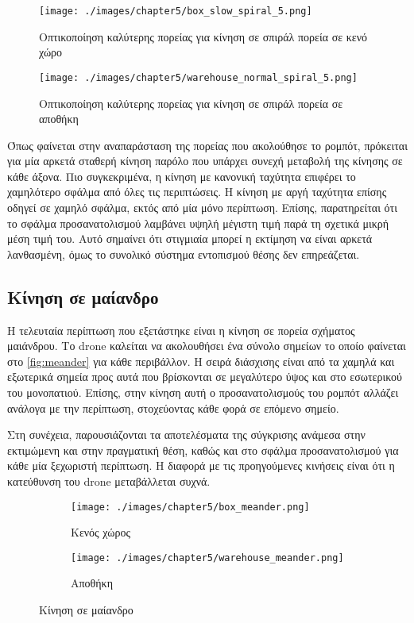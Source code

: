 \begin{figure}[!ht]
    \centering
    \texttt{[image: ./images/chapter5/box\_slow\_spiral\_5.png]}
    \caption{Οπτικοποίηση καλύτερης πορείας για κίνηση σε σπιράλ πορεία σε κενό χώρο}
    \label{fig:path_spiral_slow_corridor}
\end{figure}

\begin{figure}[!ht]
    \centering
    \texttt{[image: ./images/chapter5/warehouse\_normal\_spiral\_5.png]}
    \caption{Οπτικοποίηση καλύτερης πορείας για κίνηση σε σπιράλ πορεία σε αποθήκη}
    \label{fig:path_spiral_normal_warehouse}
\end{figure}
Όπως φαίνεται στην αναπαράσταση της πορείας που ακολούθησε το ρομπότ, πρόκειται για μία αρκετά σταθερή κίνηση παρόλο που υπάρχει συνεχή μεταβολή της κίνησης σε κάθε άξονα. Πιο συγκεκριμένα, η κίνηση με κανονική ταχύτητα επιφέρει το χαμηλότερο σφάλμα από όλες τις περιπτώσεις. Η κίνηση με αργή ταχύτητα επίσης οδηγεί σε χαμηλό σφάλμα, εκτός από μία μόνο περίπτωση. Επίσης, παρατηρείται ότι το σφάλμα προσανατολισμού λαμβάνει υψηλή μέγιστη τιμή παρά τη σχετικά μικρή μέση τιμή του. Αυτό σημαίνει ότι στιγμιαία μπορεί η εκτίμηση να είναι αρκετά λανθασμένη, όμως το συνολικό σύστημα εντοπισμού θέσης δεν επηρεάζεται.

\clearpage

\subsection{Κίνηση σε μαίανδρο}
\label{subsection:localization_tests_meander}

Η τελευταία περίπτωση που εξετάστηκε είναι η κίνηση σε πορεία σχήματος μαιάνδρου. Το drone καλείται να ακολουθήσει ένα σύνολο σημείων το οποίο φαίνεται στο \autoref{fig:meander} για κάθε περιβάλλον. Η σειρά διάσχισης είναι από τα χαμηλά και εξωτερικά σημεία προς αυτά που βρίσκονται σε μεγαλύτερο ύψος και στο εσωτερικού του μονοπατιού. Επίσης, στην κίνηση αυτή ο προσανατολισμούς του ρομπότ αλλάζει ανάλογα με την περίπτωση, στοχεύοντας κάθε φορά σε επόμενο σημείο.

Στη συνέχεια, παρουσιάζονται τα αποτελέσματα της σύγκρισης ανάμεσα στην εκτιμώμενη και στην πραγματική θέση, καθώς και στο σφάλμα προσανατολισμού για κάθε μία ξεχωριστή περίπτωση. Η διαφορά με τις προηγούμενες κινήσεις είναι ότι η κατεύθυνση του drone μεταβάλλεται συχνά.

\begin{figure}[!ht]
        \begin{subfigure}{0.5\textwidth}
            \texttt{[image: ./images/chapter5/box\_meander.png]}
                \caption{Κενός χώρος}
             \label{fig:box_meander}
        \end{subfigure}
        \begin{subfigure}{0.5\textwidth}
            \texttt{[image: ./images/chapter5/warehouse\_meander.png]}
            \caption{Αποθήκη}
            \label{fig:warehouse_meander}
        \end{subfigure}
        \caption{Κίνηση σε μαίανδρο}
        \label{fig:meander}
\end{figure}


